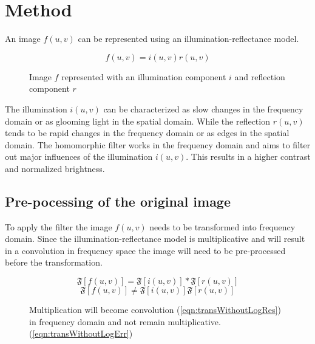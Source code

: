 \section{Method}

An image $f(u,v)$ can be represented using an illumination-reflectance model. 
\begin{figure}[h!]
\begin{equation}
  f(u,v) = i(u,v) r(u,v)
  \label{eqn:im1}
\end{equation}
\caption{Image $f$ represented with an illumination component $i$ and reflection component $r$}
\end{figure}
The illumination $i(u,v)$ can be characterized as slow changes in the frequency domain or as glooming light in the spatial domain. While the reflection $r(u,v)$ tends to be rapid changes in the frequency domain or as edges in the spatial domain. The homomorphic filter works in the frequency domain and aims to filter out major influences of the illumination $i(u,v)$. This results in a higher contrast and normalized brightness. \\

\subsection{Pre-pocessing of the original image}
To apply the filter the image $f(u,v)$ needs to be transformed into frequency domain. Since the illumination-reflectance model is multiplicative and will result in a convolution in frequency space the image will need to be pre-processed before the transformation.

\begin{figure}[h!]
\begin{equation}
  \mathfrak{F}[f(u,v)] = \mathfrak{F}[i(u,v)] \ast \mathfrak{F}[r(u,v)] 
  \label{eqn:transWithoutLogRes}
\end{equation}
\begin{equation}
  \mathfrak{F}[f(u,v)] \neq \mathfrak{F}[i(u,v)] \mathfrak{F}[r(u,v)] 
  \label{eqn:transWithoutLogErr}
\end{equation}
\caption{Multiplication will become convolution (\ref{eqn:transWithoutLogRes}) in frequency domain and not remain multiplicative.(\ref{eqn:transWithoutLogErr})}
\end{figure}

